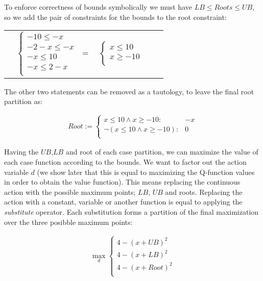To enforce correctness of bounds symbolically we must have $\mathit{LB} \leq \mathit{Root}s \leq \mathit{UB}$, so we add the pair of constraints for the bounds to the root constraint:

{\footnotesize
\begin{center}
\begin{tabular}{r c c c l}
&
\hspace{-9mm} $
  \begin{cases}
-10 \leq -x \\ 
-2 -x \leq -x \\ 
-x \leq 10 \\ 
-x \leq 2 -x\\ 
  \end{cases}$
$=$
&
\hspace{-4mm}
$ \begin{cases}
x \leq 10 \\ 
x \geq -10\\ 
  \end{cases}$
\end{tabular}
\end{center}
}
The other two statements can be removed as a tautology, to leave the final root partition as: 

\begin{align*}\mathit{Root}:= 
 \begin{cases}
x \leq 10 \wedge x \geq -10:              & -x\\ 
\neg (x \leq 10 \wedge x \geq -10):    & 0\\ 
  \end{cases}
\end{align*}

Having the $\mathit{UB}$,$\mathit{LB}$ and root of each case partition, we can maximize the value of each case function according to the bounds. We want to factor out the action variable $d$ (we show later that this is equal to maximizing the Q-function values in order to obtain the value function). This means replacing the continuous action with the possible maximum points; $\mathit{LB}$, $\mathit{UB}$ and roots. Replacing the action with a constant, variable or another function is equal to applying the \emph{substitute} operator. Each substitution forms a partition of the final maximization over the three posibble maximum points: 

\begin{align*}
\max_{d}
\begin{cases}
4 - (x+ \mathit{UB})^2 \\ 
4- (x+\mathit{LB})^2 \\ 
4 - (x+\mathit{Root})^2\\ 
  \end{cases}
\end{align*}

